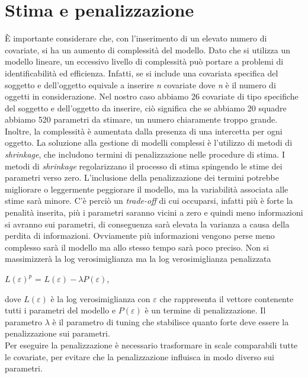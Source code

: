 \section{Stima e penalizzazione}
È importante considerare che, con l'inserimento di un elevato numero di covariate, si ha un aumento di complessità del modello. Dato che si utilizza un modello lineare, un eccessivo livello di complessità può portare a problemi di identificabilità ed efficienza. Infatti, se si include una covariata specifica del soggetto e dell'oggetto equivale a inserire \emph{n} covariate dove \emph{n} è il numero di oggetti in considerazione. Nel nostro caso abbiamo 26 covariate di tipo specifiche del soggetto e dell'oggetto da inserire, ciò significa che se abbiamo 20 squadre abbiamo 520 parametri da stimare, un numero chiaramente troppo grande. Inoltre, la complessità è aumentata dalla presenza di una intercetta per ogni oggetto. La soluzione alla gestione di modelli complessi è l'utilizzo di metodi di \emph{shrinkage}, che includono termini di penalizzazione nelle procedure di stima. I metodi di \emph{shrinkage} \autocite{copas1983regression} regolarizzano il processo di stima spingendo le stime dei parametri verso zero.
L'inclusione della penalizzazione dei termini potrebbe migliorare o leggermente peggiorare il modello, ma la variabilità associata alle stime sarà minore. C'è perciò un \emph{trade-off} di cui occuparsi, infatti più è forte la penalità inserita, più i parametri saranno vicini a zero e quindi meno informazioni si avranno sui parametri, di conseguenza sarà elevata la varianza a causa della perdita di informazioni. Ovviamente più informazioni vengono perse meno complesso sarà il modello ma allo stesso tempo sarà poco preciso. Non si massimizzerà la log verosimiglianza ma la log verosimiglianza penalizzata 
\begin{center}
	$ L(\varepsilon)^{p}$ = $L(\varepsilon) - \lambda P(\varepsilon)$,
\end{center}
dove $L(\varepsilon)$ è la log verosimiglianza con $\varepsilon$ che rappresenta il vettore contenente tutti i parametri del modello e $P(\varepsilon)$ è un termine di penalizzazione. Il parametro $\lambda$ è il parametro di tuning che stabilisce quanto forte deve essere la penalizzazione sui parametri. \\
Per eseguire la penalizzazione è necessario trasformare in scale comparabili tutte le covariate, per evitare che la penalizzazione influisca in modo diverso sui parametri.\\
